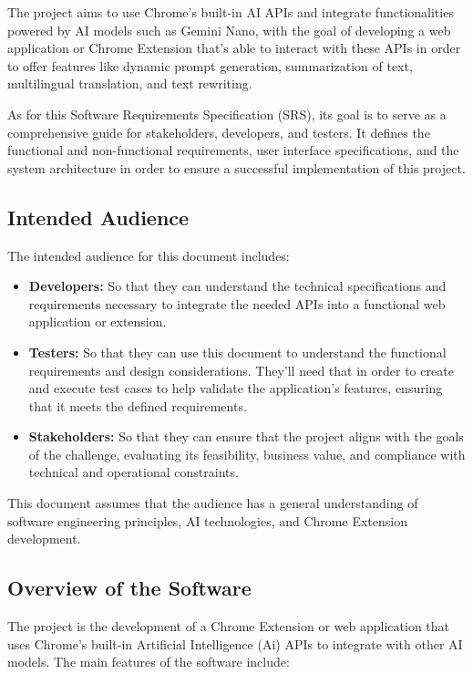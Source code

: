 \documentclass{article}
\begin{document}
The project aims to use Chrome's built-in AI APIs and integrate functionalities powered by AI models such as Gemini Nano, with the goal of developing a web application or Chrome Extension that's able to interact with these APIs in order to offer features like dynamic prompt generation, summarization of text, multilingual translation, and text rewriting.

As for this Software Requirements Specification (SRS), its goal is to serve as a comprehensive guide for stakeholders, developers, and testers. It defines the functional and non-functional requirements, user interface specifications, and the system architecture in order to ensure a successful implementation of this project.

\subsection{Intended Audience}
The intended audience for this document includes:
\begin{itemize}
    \item \textbf{Developers:} So that they can understand the technical specifications and requirements necessary to integrate the needed APIs into a functional web application or extension. 
    \item \textbf{Testers:} So that they can use this document to understand the functional requirements and design considerations. They'll need that in order to create and execute test cases to help validate the application’s features, ensuring that it meets the defined requirements.
    \item \textbf{Stakeholders:} So that they can ensure that the project aligns with the goals of the challenge, evaluating its feasibility, business value, and compliance with technical and operational constraints.
\end{itemize}

This document assumes that the audience has a general understanding of software engineering principles, AI technologies, and Chrome Extension development.

\subsection{Overview of the Software}
 The project is the development of a Chrome Extension or web application that uses Chrome’s built-in Artificial Intelligence (Ai) APIs to integrate with other AI models. The main features of the software include:
\end{document}

